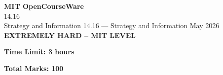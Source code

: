 \documentclass[12pt,a4paper]{exam}
\begin{document}
\begin{center}
{\LARGE \textbf{MIT OpenCourseWare}}\\14.16\\Strategy and Information
\vspace{0.5cm}
{14.16} --- {Strategy and Information}
\vspace{0.3cm}
May 2026
\vspace{0.3cm}
\textbf{EXTREMELY HARD -- MIT LEVEL}
\end{center}

\begin{center}
\textbf{Time Limit: 3 hours}
\end{center}

\begin{center}
\textbf{Total Marks: 100}
\end{center}

\vspace{0.5cm}
\end{document}
